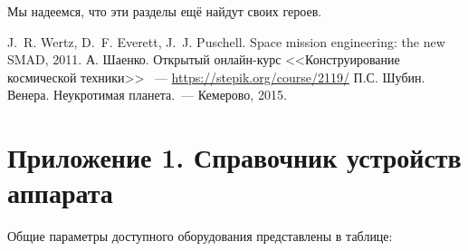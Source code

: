 \documentclass[12pt,a4paper]{article}
\begin{document}
Мы надеемся, что эти разделы ещё найдут своих героев.

\begin{thebibliography}{3}
 J.~R. Wertz, D.~F. Everett, J.~J. Puschell. Space mission
engineering: the new SMAD, 2011.
 А. Шаенко. Открытый онлайн-курс <<Конструирование космической техники>> ~---
  \url{https://stepik.org/course/2119/}
 П.С. Шубин. Венера. Неукротимая планета.~--- Кемерово, 2015. 
\end{thebibliography}

\section*{Приложение 1. Справочник устройств аппарата}
\label{Sec:Devices}

Общие параметры доступного оборудования представлены в таблице:
\end{document}
